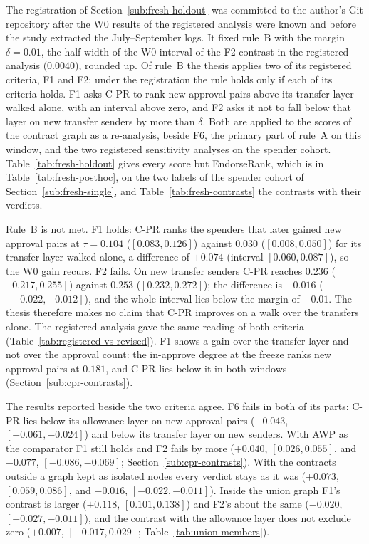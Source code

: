 
The registration of Section~\ref{sub:fresh-holdout} was committed to the author's Git repository after the W0 results of the registered analysis were known and before the study extracted the July--September logs. It fixed rule~B with the margin $\delta=0.01$, the half-width of the W0 interval of the F2 contrast in the registered analysis ($0.0040$), rounded up. Of rule~B the thesis applies two of its registered criteria, F1 and F2; under the registration the rule holds only if each of its criteria holds. F1 asks \mbox{C-PR} to rank new approval pairs above its transfer layer walked alone, with an interval above zero, and F2 asks it not to fall below that layer on new transfer senders by more than $\delta$. Both are applied to the scores of the contract graph as a re-analysis, beside F6, the primary part of rule~A on this window, and the two registered sensitivity analyses on the spender cohort. Table~\ref{tab:fresh-holdout} gives every score but EndorseRank, which is in Table~\ref{tab:fresh-posthoc}, on the two labels of the spender cohort of Section~\ref{sub:fresh-single}, and Table~\ref{tab:fresh-contrasts} the contrasts with their verdicts.





Rule~B is not met. F1 holds: \mbox{C-PR} ranks the spenders that later gained new approval pairs at $\tau=0.104$ ($[0.083,0.126]$) against $0.030$ ($[0.008,0.050]$) for its transfer layer walked alone, a difference of $+0.074$ (interval $[0.060,0.087]$), so the W0 gain recurs. F2 fails. On new transfer senders \mbox{C-PR} reaches $0.236$ ($[0.217,0.255]$) against $0.253$ ($[0.232,0.272]$); the difference is $-0.016$ ($[-0.022,-0.012]$), and the whole interval lies below the margin of $-0.01$. The thesis therefore makes no claim that \mbox{C-PR} improves on a walk over the transfers alone. The registered analysis gave the same reading of both criteria (Table~\ref{tab:registered-vs-revised}). F1 shows a gain over the transfer layer and not over the approval count: the in-approve degree at the freeze ranks new approval pairs at $0.181$, and \mbox{C-PR} lies below it in both windows (Section~\ref{sub:cpr-contrasts}).

The results reported beside the two criteria agree. F6 fails in both of its parts: \mbox{C-PR} lies below its allowance layer on new approval pairs ($-0.043$, $[-0.061,-0.024]$) and below its transfer layer on new senders. With AWP as the comparator F1 still holds and F2 fails by more ($+0.040$, $[0.026,0.055]$, and $-0.077$, $[-0.086,-0.069]$; Section~\ref{sub:cpr-contrasts}). With the contracts outside a graph kept as isolated nodes every verdict stays as it was ($+0.073$, $[0.059,0.086]$, and $-0.016$, $[-0.022,-0.011]$). Inside the union graph F1's contrast is larger ($+0.118$, $[0.101,0.138]$) and F2's about the same ($-0.020$, $[-0.027,-0.011]$), and the contrast with the allowance layer does not exclude zero ($+0.007$, $[-0.017,0.029]$; Table~\ref{tab:union-members}).

